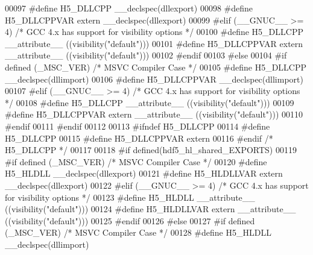 \begin{DoxyCode}
00097 \textcolor{preprocessor}{    #define H5\_DLLCPP \_\_declspec(dllexport)}
00098 \textcolor{preprocessor}{    #define H5\_DLLCPPVAR extern \_\_declspec(dllexport)}
00099 \textcolor{preprocessor}{  #elif (\_\_GNUC\_\_ >= 4)  }\textcolor{comment}{/* GCC 4.x has support for visibility options */}\textcolor{preprocessor}{}
00100 \textcolor{preprocessor}{    #define H5\_DLLCPP \_\_attribute\_\_ ((visibility("default")))}
00101 \textcolor{preprocessor}{    #define H5\_DLLCPPVAR extern \_\_attribute\_\_ ((visibility("default")))}
00102 \textcolor{preprocessor}{  #endif}
00103 \textcolor{preprocessor}{#else}
00104 \textcolor{preprocessor}{  #if defined (\_MSC\_VER)  }\textcolor{comment}{/* MSVC Compiler Case */}\textcolor{preprocessor}{}
00105 \textcolor{preprocessor}{    #define H5\_DLLCPP \_\_declspec(dllimport)}
00106 \textcolor{preprocessor}{    #define H5\_DLLCPPVAR \_\_declspec(dllimport)}
00107 \textcolor{preprocessor}{  #elif (\_\_GNUC\_\_ >= 4)  }\textcolor{comment}{/* GCC 4.x has support for visibility options */}\textcolor{preprocessor}{}
00108 \textcolor{preprocessor}{    #define H5\_DLLCPP \_\_attribute\_\_ ((visibility("default")))}
00109 \textcolor{preprocessor}{    #define H5\_DLLCPPVAR extern \_\_attribute\_\_ ((visibility("default")))}
00110 \textcolor{preprocessor}{  #endif}
00111 \textcolor{preprocessor}{#endif}
00112 
00113 \textcolor{preprocessor}{#ifndef H5\_DLLCPP}
00114 \textcolor{preprocessor}{  #define H5\_DLLCPP}
00115 \textcolor{preprocessor}{  #define H5\_DLLCPPVAR extern}
00116 \textcolor{preprocessor}{#endif }\textcolor{comment}{/* H5\_DLLCPP */}\textcolor{preprocessor}{}
00117 
00118 \textcolor{preprocessor}{#if defined(hdf5\_hl\_shared\_EXPORTS)}
00119 \textcolor{preprocessor}{  #if defined (\_MSC\_VER)  }\textcolor{comment}{/* MSVC Compiler Case */}\textcolor{preprocessor}{}
00120 \textcolor{preprocessor}{    #define H5\_HLDLL \_\_declspec(dllexport)}
00121 \textcolor{preprocessor}{    #define H5\_HLDLLVAR extern \_\_declspec(dllexport)}
00122 \textcolor{preprocessor}{  #elif (\_\_GNUC\_\_ >= 4)  }\textcolor{comment}{/* GCC 4.x has support for visibility options */}\textcolor{preprocessor}{}
00123 \textcolor{preprocessor}{    #define H5\_HLDLL \_\_attribute\_\_ ((visibility("default")))}
00124 \textcolor{preprocessor}{    #define H5\_HLDLLVAR extern \_\_attribute\_\_ ((visibility("default")))}
00125 \textcolor{preprocessor}{  #endif}
00126 \textcolor{preprocessor}{#else}
00127 \textcolor{preprocessor}{  #if defined (\_MSC\_VER)  }\textcolor{comment}{/* MSVC Compiler Case */}\textcolor{preprocessor}{}
00128 \textcolor{preprocessor}{    #define H5\_HLDLL \_\_declspec(dllimport)}

\end{DoxyCode}
